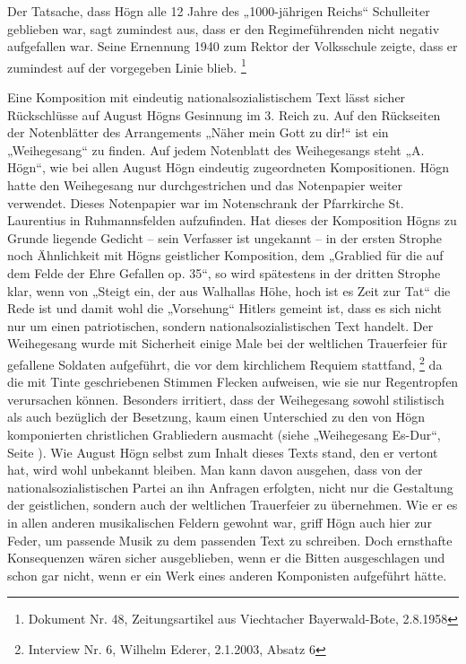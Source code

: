 Der Tatsache, dass Högn alle 12 Jahre des „1000-jährigen Reichs“
Schulleiter geblieben war, sagt zumindest aus, dass er den
Regimeführenden nicht negativ aufgefallen war. Seine Ernennung 1940 zum
Rektor der Volksschule zeigte, dass er zumindest auf der vorgegeben
Linie blieb. \footnote{Dokument Nr. 48, Zeitungsartikel aus Viechtacher
Bayerwald-Bote, 2.8.1958}

Eine Komposition mit eindeutig nationalsozialistischem Text lässt sicher
Rückschlüsse auf August Högns Gesinnung im 3. Reich zu. Auf den
Rückseiten der Notenblätter des Arrangements „Näher mein Gott zu dir!“
ist ein „Weihegesang“ zu finden. Auf jedem Notenblatt des Weihegesangs
steht „A. Högn“, wie bei allen August Högn eindeutig zugeordneten
Kompositionen. Högn hatte den Weihegesang nur durchgestrichen und das
Notenpapier weiter verwendet. Dieses Notenpapier war im Notenschrank
der Pfarrkirche St. Laurentius in Ruhmannsfelden aufzufinden. Hat
dieses der Komposition Högns zu Grunde liegende Gedicht – sein
Verfasser ist ungekannt – in der ersten Strophe noch Ähnlichkeit mit
Högns geistlicher Komposition, dem „Grablied für die auf dem Felde der
Ehre Gefallen op. 35“, so wird spätestens in der dritten Strophe klar,
wenn von „Steigt ein, der aus Walhallas Höhe, hoch ist es Zeit zur Tat“
die Rede ist und damit wohl die „Vorsehung“ Hitlers gemeint ist, dass
es sich nicht nur um einen patriotischen, sondern
nationalsozialistischen Text handelt. Der Weihegesang wurde mit
Sicherheit einige Male bei der weltlichen Trauerfeier für gefallene
Soldaten aufgeführt, die vor dem kirchlichem Requiem
stattfand, \footnote{Interview Nr. 6, Wilhelm Ederer, 2.1.2003, Absatz
6} da die mit Tinte geschriebenen Stimmen Flecken aufweisen, wie sie
nur Regentropfen verursachen können. Besonders irritiert, dass der
Weihegesang sowohl stilistisch als auch bezüglich der Besetzung, kaum
einen Unterschied zu den von Högn komponierten christlichen Grabliedern
ausmacht (siehe  „Weihegesang Es-Dur“, Seite
). Wie August Högn selbst zum Inhalt dieses
Texts stand, den er vertont hat, wird wohl unbekannt bleiben. Man kann
davon ausgehen, dass von der nationalsozialistischen Partei an ihn
Anfragen erfolgten, nicht nur die Gestaltung der geistlichen, sondern
auch der weltlichen Trauerfeier zu übernehmen. Wie er es in allen
anderen musikalischen Feldern gewohnt war, griff Högn auch hier zur
Feder, um passende Musik zu dem passenden Text zu schreiben. Doch
ernsthafte Konsequenzen wären sicher ausgeblieben, wenn er die Bitten
ausgeschlagen und schon gar nicht, wenn er ein Werk eines anderen
Komponisten aufgeführt hätte.


